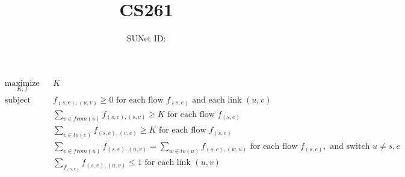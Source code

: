 \documentclass{article}
\title{CS261 \exerciseset}
\author{\studentname \qquad SUNet ID: \suid}
\begin{document}
\maketitle

\begin{equation*}
  \begin{aligned}
  & \underset{K, f}{\text{maximize}}
  & & K \\
  & \text{subject to}
  & & f_{(s, e), (u, v)} \geq 0 \text{ for each flow } f_{(s, e)} \text{ and
  each link } (u, v)\\
  &&& \sum_{v \in from(s)} f_{(s, e), (s, v)} \geq K \text{ for
  each flow } f_{(s, e)} \\
  &&& \sum_{v \in to(e)} f_{(s, e), (v, e)} \geq K \text{ for each flow }
  f_{(s, e)} \\
  &&& \sum_{v \in from(u)} f_{(s, e), (u, v)} = \sum_{w \in to(u)}
  f_{(s, e), (w, u)} \text{ for each flow } f_{(s, e)},
  \text{ and switch } u \neq s, e \\
  &&& \sum_{f_{(s, e)}} f_{(s, e), (u, v)} \leq 1 \text{ for each link } (u, v)
  \end{aligned}
\end{equation*}
\end{document}
